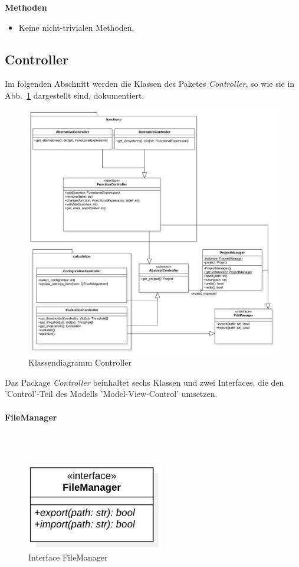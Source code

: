 \documentclass{article}
\newcommand{\classheader}[2][]{\paragraph{#2}
\mbox{}\textit{#1}\\\\}
\begin{document}
\textbf{Methoden}
\begin{itemize}\setlength\itemsep{3em}
\item[] Keine nicht-trivialen Methoden.
\end{itemize}
\newpage
\subsection{Controller}

Im folgenden Abschnitt werden die Klassen des Paketes \emph{Controller}, so wie sie in Abb.~\ref{fig:ControllerKlassendiagramm} dargestellt sind, dokumentiert.

\begin{figure}[H]%
    \centering
    \includegraphics[width=13cm]{entwurf/Floriane/ControllerKlassendiagramm.png}
    \caption{Klassendiagramm Controller}
    \label{fig:ControllerKlassendiagramm}
\end{figure}

Das Package \textit{Controller} beinhaltet sechs Klassen und zwei Interfaces, die den 'Control'-Teil des Modells 'Model-View-Control' umsetzen.

\newpage
\classheader{FileManager}\label{cls:FileManager}
\begin{figure}[H]%
    \centering
    \includegraphics[width=6cm]{entwurf/Floriane/FileManager.png}
    \caption{Interface FileManager}
\end{figure}
\end{document}
